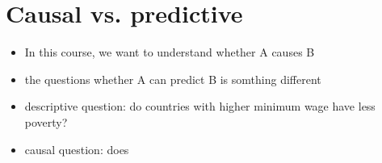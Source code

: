 \documentclass[10pt]{article}
\begin{document}
\section{Causal vs. predictive}
\begin{itemize}
    \item In this course, we want to understand whether A causes B 
    \item the questions whether A can predict B is somthing different 
    \item descriptive question: do countries with higher minimum wage have less poverty?
    \item causal question: does 
\end{itemize}
\end{document}
